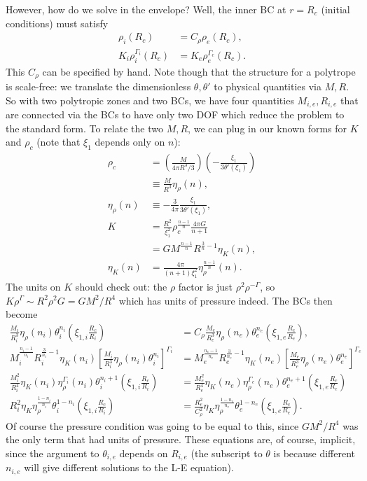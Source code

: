 \documentclass[11pt,
        usenames, %
        twocolumn,
        landscape,
        dvipsnames %
    ]{article}
\newcommand*{\p}[1]{\left(#1\right)}
\newcommand*{\s}[1]{\left[#1\right]}
\begin{document}
However, how do we solve in the envelope? Well, the inner BC at $r = R_c$
(initial conditions) must satisfy
\begin{align}
    \rho_i(R_{c}) &= C_\rho \rho_e\p{R_c},\\
    K_i\rho_i^{\Gamma_i}(R_c) &= K_e\rho_e^{\Gamma_e}(R_c).
\end{align}
This $C_\rho$ can be specified by hand. Note though that the structure for a
polytrope is scale-free: we translate the dimensionless $\theta, \theta'$ to
physical quantities via $M, R$. So with two polytropic zones and two BCs, we
have four quantities $M_{i,e}, R_{i,e}$ that are connected via the BCs to have
only two DOF which reduce the problem to the standard form. To relate the two
$M, R$, we can plug in our known forms for $K$ and $\rho_c$ (note that $\xi_1$
depends only on $n$):
\begin{align}
    \rho_c &= \p{\frac{M}{4\pi R^3/3}}\p{-\frac{\xi_1}{3\theta'(\xi_1)}}
        \nonumber\\
        &\equiv \frac{M}{R^3}\eta_\rho(n),\\
    \eta_\rho(n) &\equiv -\frac{3}{4\pi}\frac{\xi_1}{3\theta'(\xi_1)},\\
    K &= \frac{R^2}{\xi_1^2}\rho_c^{\frac{n - 1}{n}}\frac{4\pi G}{n + 1}
            \nonumber\\
        &= GM^{\frac{n - 1}{n}}R^{\frac{3}{n} - 1}\eta_K(n),\\
    \eta_K(n) &=
        \frac{4\pi}{(n + 1)\xi_1^2}\eta_\rho^{\frac{n - 1}{n}}(n).
\end{align}
The units on $K$ should check out: the $\rho$ factor is just
$\rho^2\rho^{-\Gamma}$, so $K\rho^\Gamma \sim R^2\rho^2G = GM^2/R^4$ which has
units of pressure indeed. The BCs then become
\begin{align}
    \frac{M_i}{R_i^3}\eta_\rho(n_i)\theta_i^{n_i}\p{\xi_{1, i}\frac{R_c}{R_i}}
        &= C_\rho\frac{M_e}{R_e^3}\eta_\rho(n_e)
            \theta_e^{n_e}\p{\xi_{1, e}\frac{R_c}{R_e}} ,\\
    M_i^{\frac{n_i - 1}{n_i}}R_i^{\frac{3}{n_i} - 1}\eta_K(n_i)
            \s{\frac{M_i}{R_i^3}\eta_\rho(n_i)\theta_i^{n_i}}^{\Gamma_i}
        &= M_e^{\frac{n_e - 1}{n_e}}R_e^{\frac{3}{n_e} - 1}\eta_K(n_e)
            \s{\frac{M_e}{R_e^3}\eta_\rho(n_e)\theta_e^{n_e}}^{\Gamma_e}\nonumber\\
    \frac{M_i^2}{R_i^{4}}\eta_K(n_i)\eta_\rho^{\Gamma_i}(n_i)
            \theta_i^{n_i + 1}\p{\xi_{1, i}\frac{R_c}{R_i}}
        &= \frac{M_e^2}{R_e^{4}}\eta_K(n_e)\eta_\rho^{\Gamma_e}(n_e)
            \theta_e^{n_e + 1}\p{\xi_{1, e}\frac{R_c}{R_e}}\nonumber\\
    R_i^2\eta_K\eta_\rho^{\frac{1 - n_i}{n_i}}
            \theta_i^{1 - n_i}\p{\xi_{1, i}\frac{R_c}{R_i}}
        &= \frac{R_e^2}{C_\rho^2}\eta_K\eta_\rho^{\frac{1 - n_e}{n_e}}
            \theta_e^{1 - n_e}\p{\xi_{1, e}\frac{R_c}{R_e}}.
\end{align}
Of course the pressure condition was going to be equal to this, since $GM^2/R^4$
was the only term that had units of pressure. These equations are, of course,
implicit, since the argument to $\theta_{i,e}$ depends on $R_{i, e}$ (the
subscript to $\theta$ is because different $n_{i, e}$ will give different
solutions to the L-E equation).
\end{document}
